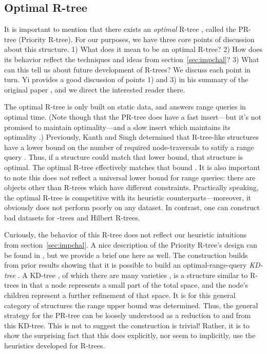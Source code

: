 \subsection{Optimal R-tree}
It is important to mention that there exists an \emph{optimal} R-tree \cite{argeberghaverkortyi04}, called the PR-tree (Priority R-tree).
For our purposes, we have three core points of discussion about this structure.
1) What does it mean to be an optimal R-tree?
2) How does its behavior reflect the techniques and ideas from section~\ref{sec:impchal}?
3) What can this tell us about future development of R-trees?
We discuss each point in turn.
Yi provides a good discussion of points 1) and 3) in his summary of the original paper \cite{yi12}, and we direct the interested reader there.

The optimal R-tree is only built on static data, and answers range queries in optimal time.
(Note though that the PR-tree does have a fast insert---but it's not promised to maintain optimality---and a slow insert which maintains its optimality \cite{argeberghaverkortyi04}.)
Previously, Kanth and Singh determined that R-tree-like structures have a lower bound on the number of required node-traversals to satify a range query \cite{kanthsingh99}.
Thus, if a structure could match that lower bound, that structure is optimal.
The optimal R-tree effectively matches that bound \cite{yi12}.
It is also important to note this does \emph{not} reflect a universal lower bound for range queries: there are objects other than R-trees \cite{argesamoladasvitter99} which have different constraints.
Practically speaking, the optimal R-tree is competitive with its heuristic counterparts---moreover, it obviously does not perform poorly on any dataset.
In contrast, one can construct bad datasets for \rstar-trees and Hilbert R-trees.

Curiously, the behavior of this R-tree does not reflect our heuristic intuitions from section~\ref{sec:impchal}.
A nice description of the Priority R-tree's design can be found in \cite{thebook}, but we provide a brief one here as well.
The construction builds from prior results showing that it is possible to build an optimal-range-query \emph{KD-tree} \cite{agarwalberggudmundssonhammarhaverkort01}.
A KD-tree \cite{bentley75}, of which there are many varieties \cite{gaedegunther98}, is a structure similar to R-trees in that a node represents a small part of the total space, and the node's children represent a further refinement of that space.
It is for this general category of structures the range upper bound was determined.
Thus, the general strategy for the PR-tree can be loosely understood as a reduction to and from this KD-tree.
This is not to suggest the construction is trivial! Rather, it is to show the surprising fact that this does explicitly, nor seem to implicitly, use the heuristics developed for R-trees.

